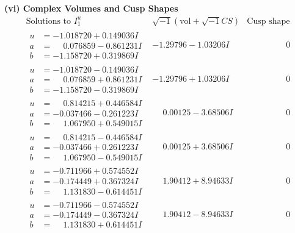 \documentclass[1p]{elsarticle_modified}
\theoremstyle{definition}
\newcommand{\I}{\sqrt{-1}}
\begin{document}
\newpage\flushleft \textbf{(vi) Complex Volumes and Cusp Shapes}
$$\begin{array}{c|c|c}  
\text{Solutions to }I^u_{1}& \I (\text{vol} + \sqrt{-1}CS) & \text{Cusp shape}\\
 \hline 
\begin{aligned}
u &= -1.018720 + 0.149036 I \\
a &= \phantom{-}0.076859 - 0.861231 I \\
b &= -1.158720 + 0.319869 I\end{aligned}
 & -1.29796 - 1.03206 I & \phantom{-0.000000 } 0 \\ \hline\begin{aligned}
u &= -1.018720 - 0.149036 I \\
a &= \phantom{-}0.076859 + 0.861231 I \\
b &= -1.158720 - 0.319869 I\end{aligned}
 & -1.29796 + 1.03206 I & \phantom{-0.000000 } 0 \\ \hline\begin{aligned}
u &= \phantom{-}0.814215 + 0.446584 I \\
a &= -0.037466 - 0.261223 I \\
b &= \phantom{-}1.067950 + 0.549015 I\end{aligned}
 & \phantom{-}0.00125 - 3.68506 I & \phantom{-0.000000 } 0 \\ \hline\begin{aligned}
u &= \phantom{-}0.814215 - 0.446584 I \\
a &= -0.037466 + 0.261223 I \\
b &= \phantom{-}1.067950 - 0.549015 I\end{aligned}
 & \phantom{-}0.00125 + 3.68506 I & \phantom{-0.000000 } 0 \\ \hline\begin{aligned}
u &= -0.711966 + 0.574552 I \\
a &= -0.174449 + 0.367324 I \\
b &= \phantom{-}1.131830 - 0.614451 I\end{aligned}
 & \phantom{-}1.90412 + 8.94633 I & \phantom{-0.000000 } 0 \\ \hline\begin{aligned}
u &= -0.711966 - 0.574552 I \\
a &= -0.174449 - 0.367324 I \\
b &= \phantom{-}1.131830 + 0.614451 I\end{aligned}
 & \phantom{-}1.90412 - 8.94633 I & \phantom{-0.000000 } 0 \\ \hline\begin{aligned}

\end{aligned}
\end{array}$$
\end{document}
